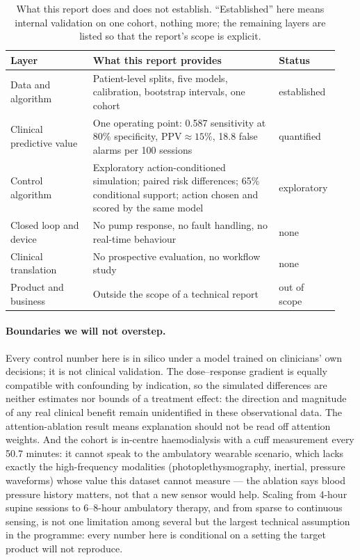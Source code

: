 \documentclass{article}
\begin{document}
\begin{table}[t]
\caption{What this report does and does not establish. ``Established'' here means internal validation on one cohort, nothing
more; the remaining layers are listed so that the report's scope is explicit.}
\label{tab:evidence}
\centering
\small
\begin{tabular}{>{\raggedright\arraybackslash}p{0.24\linewidth}>{\raggedright\arraybackslash}p{0.54\linewidth}>{\raggedright\arraybackslash}p{0.16\linewidth}}
\toprule
Layer & What this report provides & Status \\
\midrule
Data and algorithm & Patient-level splits, five models, calibration, bootstrap intervals, one cohort & established \\[3pt]
Clinical predictive value & One operating point: 0.587 sensitivity at 80\% specificity, $\mathrm{PPV}\approx15\%$, 18.8 false alarms per 100 sessions & quantified \\[3pt]
Control algorithm & Exploratory action-conditioned simulation; paired risk differences; 65\% conditional support; action chosen and scored by the same model & exploratory \\[3pt]
Closed loop and device & No pump response, no fault handling, no real-time behaviour & none \\[3pt]
Clinical translation & No prospective evaluation, no workflow study & none \\[3pt]
Product and business & Outside the scope of a technical report & out of scope \\
\bottomrule
\end{tabular}
\end{table}

\paragraph{Boundaries we will not overstep.} Every control number here is in silico under a model trained on clinicians' own decisions; it is not clinical validation. The dose--response gradient is equally compatible with confounding by indication, so the simulated differences are neither
estimates nor bounds of a treatment effect: the direction and magnitude of any real clinical benefit remain unidentified in
these observational data. The attention-ablation result means explanation should not be read off attention weights. And the cohort is in-centre haemodialysis with a cuff measurement every 50.7 minutes: it cannot speak to the ambulatory wearable scenario, which lacks exactly the high-frequency modalities
(photoplethysmography, inertial, pressure waveforms) whose value this dataset cannot measure --- the ablation says blood
pressure history matters, not that a new sensor would help. Scaling from 4-hour supine sessions to 6--8-hour ambulatory therapy, and from sparse to continuous sensing, is not one
limitation among several but the largest technical assumption in the programme: every number here is conditional on a setting
the target product will not reproduce.
\end{document}
